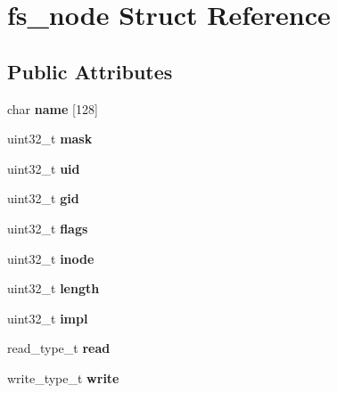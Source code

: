 \hypertarget{structfs__node}{}\section{fs\+\_\+node Struct Reference}
\label{structfs__node}
\subsection*{Public Attributes}
\begin{DoxyCompactItemize}
\item 
\mbox{\label{structfs__node_a91384c3e6adee7ca3acfd65605d75cf3}} 
char {\bfseries name} \mbox{[}128\mbox{]}
\item 
\mbox{\label{structfs__node_a27b8c12523d1d0c8e35ad01ea5278fdb}} 
uint32\+\_\+t {\bfseries mask}
\item 
\mbox{\label{structfs__node_a4ea7fe2a4779cfce8c89deb57e243971}} 
uint32\+\_\+t {\bfseries uid}
\item 
\mbox{\label{structfs__node_a7eb2d5007d55db1313d4f24ab5eefa3c}} 
uint32\+\_\+t {\bfseries gid}
\item 
\mbox{\label{structfs__node_a37ccc9837b19bc52b3693af49a713969}} 
uint32\+\_\+t {\bfseries flags}
\item 
\mbox{\label{structfs__node_a58ea47345256b432e4ba0fdc2c9e8123}} 
uint32\+\_\+t {\bfseries inode}
\item 
\mbox{\label{structfs__node_aa700c749b348090537fb3f9ab65e06f6}} 
uint32\+\_\+t {\bfseries length}
\item 
\mbox{\label{structfs__node_acea06979e49327ae684f7a0a191b0393}} 
uint32\+\_\+t {\bfseries impl}
\item 
\mbox{\label{structfs__node_aefbf96f43e0ccda3817d5fceb32ae136}} 
read\+\_\+type\+\_\+t {\bfseries read}
\item 
\mbox{\label{structfs__node_aec7893370d684ddfb43592dbbd9879c9}} 
write\+\_\+type\+\_\+t {\bfseries write}

\end{DoxyCompactItemize}
